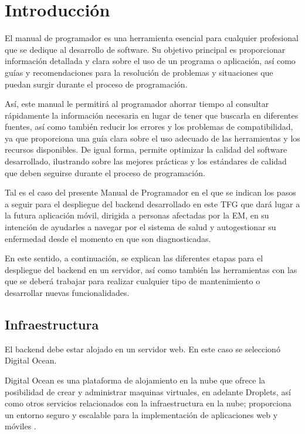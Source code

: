 \section{Introducción}
El manual de programador es una herramienta esencial para cualquier profesional que se dedique al desarrollo de software. Su objetivo principal es proporcionar información detallada y clara sobre el uso de un programa o aplicación, así como guías y recomendaciones para la resolución de problemas y situaciones que puedan surgir durante el proceso de programación.

Así, este manual le permitirá al programador ahorrar tiempo al consultar rápidamente la información necesaria en lugar de tener que buscarla en diferentes fuentes, así como también reducir los errores y los problemas de compatibilidad, ya que proporciona una guía clara sobre el uso adecuado de las herramientas y los recursos disponibles. De igual forma, permite optimizar la calidad del software desarrollado, ilustrando sobre las mejores prácticas y los estándares de calidad que deben seguirse durante el proceso de programación. 

Tal es el caso del presente Manual de Programador en el que se indican los pasos a seguir para el despliegue del backend desarrollado en este TFG que dará lugar a la futura aplicación móvil, dirigida a personas afectadas por la EM, en su intención de ayudarles a navegar por el sistema de salud y autogestionar su enfermedad desde el momento en que son diagnosticadas.

En este sentido, a continuación, se explican las diferentes etapas para el despliegue del backend en un servidor, así como también las herramientas con las que se deberá trabajar para realizar cualquier tipo de mantenimiento o desarrollar nuevas funcionalidades.

\subsection{Infraestructura}\label{infraestructura}
El backend debe estar alojado en un servidor web. En este caso se seleccionó Digital Ocean.

Digital Ocean es una plataforma de alojamiento en la nube que ofrece la posibilidad de crear y administrar maquinas virtuales, en adelante Droplets, así como otros servicios relacionados con la infraestructura en la nube; proporciona un entorno seguro y escalable para la implementación de aplicaciones web y móviles \cite{web:docker}.

